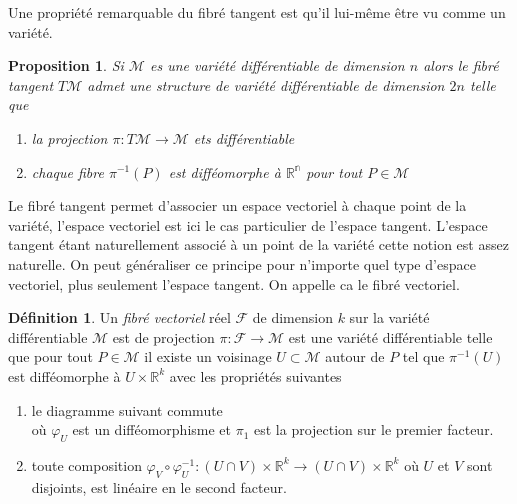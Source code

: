 \documentclass[a4paper,11pt]{report}
\theoremstyle{definition}
\theoremstyle{plain}
\newtheorem{prop}[thm]{Proposition}
\theoremstyle{definition}
\newtheorem{defn}{Définition}[chapter]
\theoremstyle{remark}
\newcommand{\M}{\mathscr{M}}
\newcommand{\F}{\mathcal{F}}
\begin{document}
                Une propriété remarquable du fibré tangent est qu'il lui-même être vu comme un variété.
                
                \begin{prop}
                    Si $\M$ es une variété différentiable de dimension $n$ alors le fibré tangent $T\M$ admet une structure de variété différentiable de dimension $2n$ telle que
                    \begin{enumerate}[label = \textit{\roman*)}]
                        \item la projection $\pi:T\M\to\M$ ets différentiable
                        \item chaque fibre $\pi^{-1}(P)$ est difféomorphe à $\mathbb{R^{n}}$ pour tout $P\in\M$
                    \end{enumerate}
                \end{prop}
                
                Le fibré tangent permet d'associer un espace vectoriel à chaque point de la variété, l'espace vectoriel est ici le cas particulier de l'espace tangent. L'espace tangent étant naturellement associé à un point de la variété cette notion est assez naturelle. On peut généraliser ce principe pour n'importe quel type d'espace vectoriel, plus seulement l'espace tangent. On appelle ca le fibré vectoriel.
                
                \begin{defn}
                    Un \textit{fibré vectoriel} réel $\F$ de dimension $k$ sur la variété différentiable $\M$ est de projection $\pi:\F\to\M$ est une variété différentiable telle que pour tout $P\in\M$ il existe un voisinage $U\subset\M$ autour de $P$ tel que $\pi^{-1}(U)$ est difféomorphe à $U\times \mathbb{R}^k$ avec les propriétés suivantes
                    \begin{enumerate}[label = \textit{\roman*)}]
                        \item le diagramme suivant commute\\
                        
                        où $\varphi_U$ est un difféomorphisme et $\pi_1$ est la projection sur le premier facteur.
                        \item toute composition $\varphi_V\circ\varphi_U^{-1} : (U\cap V)\times \mathbb{R}^k\to (U\cap V)\times \mathbb{R}^k$ où $U$ et $V$ sont disjoints, est linéaire en le second facteur.
                    \end{enumerate}
                \end{defn}
                
\end{document}
